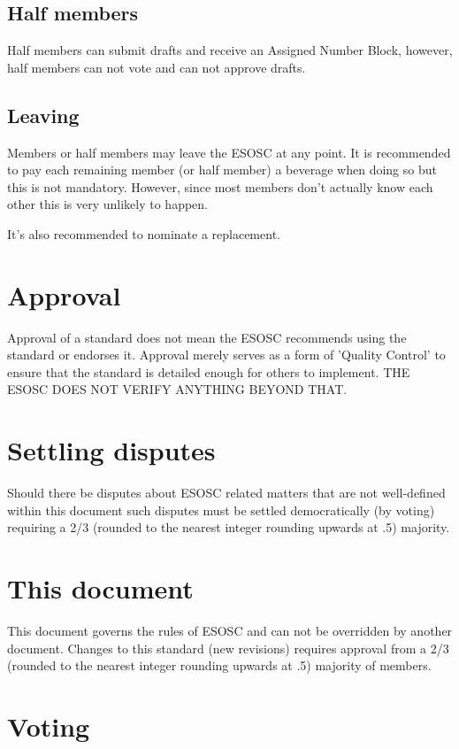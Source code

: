 \documentclass[paper=a4, fontsize=11pt]{scrartcl}
\numberwithin{equation}{section}
\numberwithin{figure}{section}
\numberwithin{table}{section}
\begin{document}
\subsection{Half members}

Half members can submit drafts and receive an Assigned Number Block, however,
half members can not vote and can not approve drafts. 

\subsection{Leaving}

Members or half members may leave the ESOSC at any point. It is recommended
to pay each remaining member (or half member) a beverage when doing so but this
is not mandatory. However, since most members don't actually know each other 
this is very unlikely to happen. 

It's also recommended to nominate a replacement. 


\section{Approval}

Approval of a standard does not mean the ESOSC recommends using the standard or
endorses it. Approval merely serves as a form of 'Quality Control' to ensure
that the standard is detailed enough for others to implement. THE ESOSC DOES
NOT VERIFY ANYTHING BEYOND THAT. 


\section{Settling disputes}

Should there be disputes about ESOSC related matters that are not well-defined
within this document such disputes must be settled democratically (by voting) requiring
a 2/3 (rounded to the nearest integer rounding upwards at .5) majority.


\section{This document}

This document governs the rules of ESOSC and can not be overridden by another
document. Changes to this standard (new revisions) requires approval from
a 2/3 (rounded to the nearest integer rounding upwards at .5) majority of members.


\section{Voting}
\end{document}
